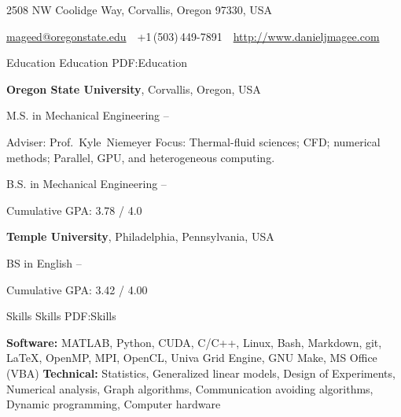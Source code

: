 \documentclass[letterpaper,MMMyyyy,nonstopmode]{simpleresumecv}
\newcommand{\CVAuthor}{Daniel J. Magee}
\newcommand{\CVWebpage}{http://www.danieljmagee.com}
\begin{document}

\Title{\CVAuthor}

\begin{SubTitle}
{2508 NW Coolidge Way, Corvallis, Oregon 97330, USA}
\par
\href{mailto:mageed@oregonstate.edu}
{mageed@oregonstate.edu}
\,\SubBulletSymbol\,
+1\,(503)\,449-7891
\,\SubBulletSymbol\,
\href{\CVWebpage}
{\url{\CVWebpage}}
\end{SubTitle}

\begin{Body}


\Section
{Education}
{Education}
{PDF:Education}

\Entry
\textbf{Oregon State University},
Corvallis, Oregon, USA

\BulletItem
M.S. in Mechanical Engineering
\hfill
{} --

\begin{Detail}
\SubBulletItem
Adviser:
Prof.~Kyle~Niemeyer
\SubBulletItem
Focus:
Thermal-fluid sciences; CFD; numerical methods; Parallel, GPU, and heterogeneous computing.
\end{Detail}

\BulletItem
B.S. in 
{Mechanical Engineering}
\hfill
{} --

\begin{Detail}
\SubBulletItem
Cumulative GPA: 3.78 / 4.0
\end{Detail}

\BigGap
\Entry
\textbf{Temple University},
Philadelphia, Pennsylvania, USA

\BulletItem
BS in English
\hfill
{} --

\begin{Detail}
\SubBulletItem
Cumulative GPA: 3.42 / 4.00
\end{Detail}


\Section
{Skills}
{Skills}
{PDF:Skills}

\Entry
\textbf{Software:} 
MATLAB,
Python,
CUDA,
C/C++,
Linux,
Bash,
Markdown,
git,
{\LaTeX},
OpenMP,
MPI,
OpenCL,
Univa Grid Engine,
GNU Make,
MS Office (VBA)
\newline
\textbf{Technical:}
Statistics, 
Generalized linear models, 
Design of Experiments, 
Numerical analysis, 
Graph algorithms,
Communication avoiding algorithms,
Dynamic programming,
Computer hardware


\end{Body}
\end{document}
